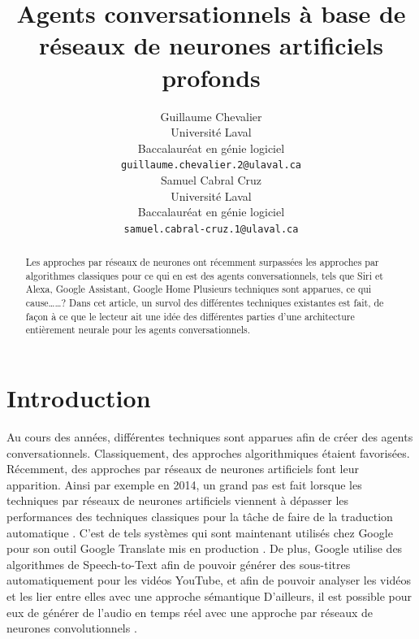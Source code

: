 \documentclass[11pt]{article}
\title{Agents conversationnels à base de réseaux de neurones artificiels profonds}
\author{Guillaume Chevalier \\
  Université Laval \\ Baccalauréat en génie logiciel \\
  {\tt \small guillaume.chevalier.2@ulaval.ca} \\\And
  Samuel Cabral Cruz \\
  Université Laval \\ Baccalauréat en génie logiciel \\
  {\tt \small samuel.cabral-cruz.1@ulaval.ca}}
\date{}
\begin{document}
\maketitle

\begin{abstract}
Les approches par réseaux de neurones ont récemment surpassées les approches par algorithmes classiques pour ce qui en est des agents conversationnels, tels que Siri et Alexa, Google Assistant, Google Home
Plusieurs techniques sont apparues, ce qui cause……? Dans cet article, un survol des différentes techniques existantes est fait, de façon à ce que le lecteur ait une idée des différentes parties d’une architecture entièrement neurale pour les agents conversationnels.
\end{abstract}

\section{Introduction}
Au cours des années, différentes techniques sont apparues afin de créer des agents conversationnels. Classiquement, des approches algorithmiques étaient favorisées. Récemment, des approches par réseaux de neurones artificiels font leur apparition. Ainsi par exemple en 2014, un grand pas est fait lorsque les techniques par réseaux de neurones artificiels viennent à dépasser les performances des techniques classiques pour la tâche de faire de la traduction automatique \cite{attentionMechanism}. C’est de tels systèmes qui sont maintenant utilisés chez Google pour son outil Google Translate mis en production \cite{googleTranslate}. De plus, Google utilise des algorithmes de Speech-to-Text afin de pouvoir générer des sous-titres automatiquement pour les vidéos YouTube, et afin de pouvoir analyser les vidéos et les lier entre elles avec une approche sémantique
D’ailleurs, il est possible pour eux de générer de l’audio en temps réel avec une approche par réseaux de neurones convolutionnels \cite{wavenet}.


\end{document}
